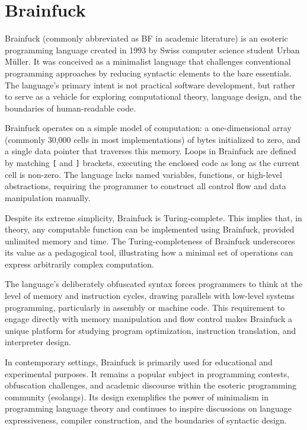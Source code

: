 \chapter{Brainfuck}
\label{chap:ch2}

\par Brainfuck (commonly abbreviated as BF in academic literature) is an esoteric programming language created in 1993 by Swiss computer science student Urban Müller. It was conceived as a minimalist language that challenges conventional programming approaches by reducing syntactic elements to the bare essentials. The language's primary intent is not practical software development, but rather to serve as a vehicle for exploring computational theory, language design, and the boundaries of human-readable code.

\par Brainfuck operates on a simple model of computation: a one-dimensional array (commonly 30,000 cells in most implementations) of bytes initialized to zero, and a single data pointer that traverses this memory. Loops in Brainfuck are defined by matching \texttt{[} and \texttt{]} brackets, executing the enclosed code as long as the current cell is non-zero. The language lacks named variables, functions, or high-level abstractions, requiring the programmer to construct all control flow and data manipulation manually.

\par Despite its extreme simplicity, Brainfuck is Turing-complete. This implies that, in theory, any computable function can be implemented using Brainfuck, provided unlimited memory and time. The Turing-completeness of Brainfuck underscores its value as a pedagogical tool, illustrating how a minimal set of operations can express arbitrarily complex computation.

\par The language's deliberately obfuscated syntax forces programmers to think at the level of memory and instruction cycles, drawing parallels with low-level systems programming, particularly in assembly or machine code. This requirement to engage directly with memory manipulation and flow control makes Brainfuck a unique platform for studying program optimization, instruction translation, and interpreter design.

\par In contemporary settings, Brainfuck is primarily used for educational and experimental purposes. It remains a popular subject in programming contests, obfuscation challenges, and academic discourse within the esoteric programming community (esolangs). Its design exemplifies the power of minimalism in programming language theory and continues to inspire discussions on language expressiveness, compiler construction, and the boundaries of syntactic design.

